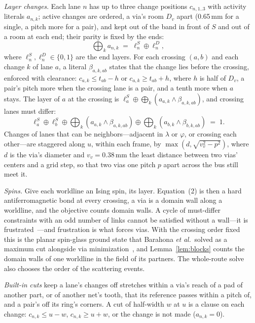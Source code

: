 \documentclass[journal]{IEEEtran}
\begin{document}
\emph{Layer changes.} Each lane $n$ has up to three change positions $c_{n,1..3}$ with activity literals $a_{n,k}$; active changes are ordered, a via's room $D_v$ apart (0.65\,mm for a single, a pitch more for a pair), and kept out of the band in front of $S$ and out of a room at each end; their parity is fixed by the ends:
\begin{equation}
\textstyle\bigoplus_k a_{n,k} \;=\; \ell^{S}_n \oplus \ell^{D}_n ,
\end{equation}
where $\ell^S_n,\ell^D_n\in\{0,1\}$ are the end layers. For each crossing $(a,b)$ and each change $k$ of lane $a$, a literal $\beta_{a,k,ab}$ states that the change lies before the crossing, enforced with clearance: $c_{a,k}\le t_{ab}-h$ or $c_{a,k}\ge t_{ab}+h$, where $h$ is half of $D_v$, a pair's pitch more when the crossing lane is a pair, and a tenth more when $a$ stays. The layer of $a$ at the crossing is $\ell^S_a\oplus\bigoplus_k(a_{a,k}\wedge\beta_{a,k,ab})$, and crossing lanes must differ:
\begin{equation}
\textstyle
\ell^S_a\oplus\ell^S_b\oplus\bigoplus_k (a_{a,k}\wedge\beta_{a,k,ab})\oplus\bigoplus_k (a_{b,k}\wedge\beta_{b,k,ab}) \;=\; 1 .
\end{equation}
Changes of lanes that can be neighbors---adjacent in $\lambda$ or $\varphi$, or crossing each other---are staggered along $u$, within each frame, by $\max(d,\sqrt{v_v^2-p^2})$, where $d$ is the via's diameter and $v_v=0.38$\,mm the least distance between two vias' centers and a grid step, so that two vias one pitch $p$ apart across the bus still meet it.

\emph{Spins.} Give each worldline an Ising spin, its layer. Equation~(2) is then a hard antiferromagnetic bond at every crossing, a via is a domain wall along a worldline, and the objective counts domain walls. A cycle of must-differ constraints with an odd number of links cannot be satisfied without a wall---it is frustrated~\cite{toulouse1977}---and frustration is what forces vias. With the crossing order fixed this is the planar spin-glass ground state that Barahona \emph{et al.}\ solved as a maximum cut alongside via minimization~\cite{barahona1988}, and Lemma~\ref{lem:blocks} counts the domain walls of one worldline in the field of its partners. The whole-route solve also chooses the order of the scattering events.

\emph{Built-in cuts} keep a lane's changes off stretches within a via's reach of a pad of another part, or of another net's tooth, that its reference passes within a pitch of, and a pair's off its ring's corners. A cut of half-width $w$ at $u$ is a clause on each change: $c_{n,k}\le u-w$, $c_{n,k}\ge u+w$, or the change is not made ($a_{n,k}=0$).
\end{document}
